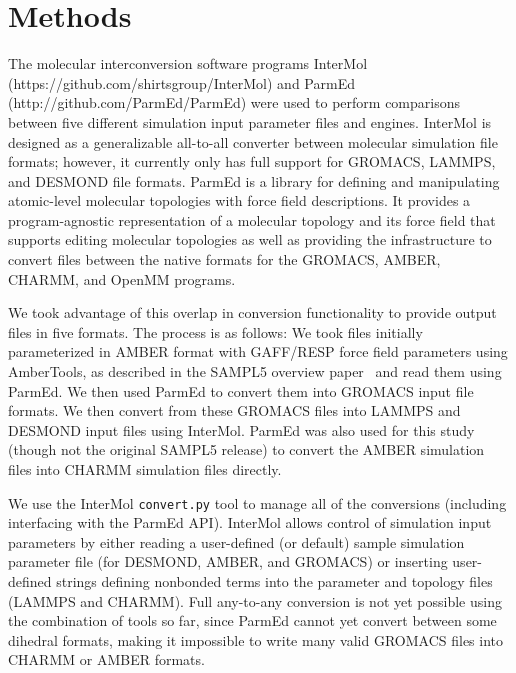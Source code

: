 
\section*{Methods}
\begin{sloppypar}
The molecular interconversion software programs InterMol
(https://github.com/shirtsgroup/InterMol) and ParmEd
(http://github.com/ParmEd/ParmEd) were used to perform comparisons
between five different simulation input parameter files and engines.
InterMol is designed as a generalizable all-to-all converter between
molecular simulation file formats; however, it currently only has full
support for GROMACS, LAMMPS, and DESMOND file formats.  ParmEd is
a library for defining and manipulating atomic-level molecular topologies with
force field descriptions. It provides a program-agnostic representation of a
molecular topology and its force field that supports editing molecular
topologies as well as providing the infrastructure to convert files between the
native formats for the GROMACS, AMBER, CHARMM, and OpenMM programs.
\end{sloppypar}

We took advantage of this overlap in conversion functionality to
provide output files in five formats. The process is as follows: We
took files initially parameterized in AMBER format with GAFF/RESP force field
parameters using AmberTools, as described in the SAMPL5 overview paper~\cite{SAMPL5Overview}
and read them using ParmEd. We then used ParmEd to convert them into
GROMACS input file formats. We then convert from these GROMACS files
into LAMMPS and DESMOND input files using InterMol.  ParmEd was also
used for this study (though not the original SAMPL5 release) to
convert the AMBER simulation files into CHARMM simulation files
directly.

We use the InterMol {\tt convert.py} tool to manage all of the conversions
(including interfacing with the ParmEd API). InterMol allows control
of simulation input parameters by either reading a user-defined (or
default) sample simulation parameter file (for DESMOND, AMBER, and
GROMACS) or inserting user-defined strings defining nonbonded terms
into the parameter and topology files (LAMMPS and CHARMM). Full
any-to-any conversion is not yet possible using the combination of
tools so far, since ParmEd cannot yet convert between some dihedral
formats, making it impossible to write many valid GROMACS files into
CHARMM or AMBER formats.


